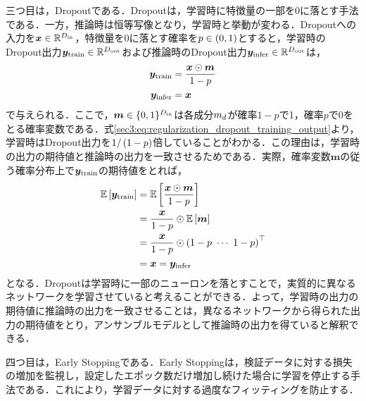 \documentclass[12pt]{jarticle}
\numberwithin{equation}{section}    %
\numberwithin{figure}{section}      %
\numberwithin{table}{section}      %
\begin{document}
三つ目は，Dropout\cite{srivastava2014dropout}である．Dropoutは，学習時に特徴量の一部を0に落とす手法である．一方，推論時は恒等写像となり，学習時と挙動が変わる．Dropoutへの入力を$\bm{x} \in \mathbb{R}^{D_{\text{in}}}$，特徴量を0に落とす確率を$p \in \left(0, 1\right)$とすると，学習時のDropout出力$\bm{y}_{\text{train}} \in \mathbb{R}^{D_{\text{out}}}$および推論時のDropout出力$\bm{y}_{\text{infer}} \in \mathbb{R}^{D_{\text{out}}}$は，
\begin{align}
    \bm{y}_{\text{train}} & = \frac{\bm{x} \odot \bm{m}}{1 - p} \label{sec3:eq:regularization_dropout_training_output} \\
    \bm{y}_{\text{infer}} & = \bm{x}
\end{align}
で与えられる．ここで，$\bm{m} \in \{0, 1\}^{D_{\text{in}}}$は各成分$m_{d}$が確率$1 - p$で1，確率$p$で0をとる確率変数である．式\eqref{sec3:eq:regularization_dropout_training_output}より，学習時はDropout出力を$1 / \left(1 - p\right)$倍していることがわかる．この理由は，学習時の出力の期待値と推論時の出力を一致させるためである．実際，確率変数$\bm{m}$の従う確率分布上で$\bm{y}_{\text{train}}$の期待値をとれば，
\begin{align}
    \mathbb{E}\left[\bm{y}_{\text{train}}\right] & = \mathbb{E} \left[\frac{\bm{x} \odot \bm{m}}{1 - p}\right]       \\
                                                        & = \frac{\bm{x}}{1 - p} \odot \mathbb{E}\left[\bm{m}\right]        \\
                                                        & = \frac{\bm{x}}{1 - p} \odot \left(1 - p ~ \cdots ~ 1 - p\right)^\top \\
                                                        & = \bm{x} = \bm{y}_{\text{infer}}
\end{align}
となる．Dropoutは学習時に一部のニューロンを落とすことで，実質的に異なるネットワークを学習させていると考えることができる．よって，学習時の出力の期待値に推論時の出力を一致させることは，異なるネットワークから得られた出力の期待値をとり，アンサンブルモデルとして推論時の出力を得ていると解釈できる．

四つ目は，Early Stoppingである．Early Stoppingは，検証データに対する損失の増加を監視し，設定したエポック数だけ増加し続けた場合に学習を停止する手法である．これにより，学習データに対する過度なフィッティングを防止する．
\end{document}
